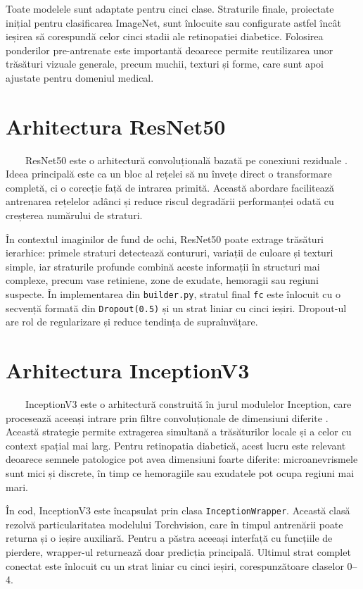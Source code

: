 \documentclass[12pt, a4paper, oneside, romanian]{teza-upb}
\begin{document}
Toate modelele sunt adaptate pentru cinci clase. Straturile finale, proiectate inițial pentru clasificarea ImageNet, sunt înlocuite sau configurate astfel încât ieșirea să corespundă celor cinci stadii ale retinopatiei diabetice. Folosirea ponderilor pre-antrenate este importantă deoarece permite reutilizarea unor trăsături vizuale generale, precum muchii, texturi și forme, care sunt apoi ajustate pentru domeniul medical.

\section{Arhitectura ResNet50}

\ \ \ \ ResNet50 este o arhitectură convoluțională bazată pe conexiuni reziduale \cite{21_he2016deep}. Ideea principală este ca un bloc al rețelei să nu învețe direct o transformare completă, ci o corecție față de intrarea primită. Această abordare facilitează antrenarea rețelelor adânci și reduce riscul degradării performanței odată cu creșterea numărului de straturi.
\bigskip

În contextul imaginilor de fund de ochi, ResNet50 poate extrage trăsături ierarhice: primele straturi detectează contururi, variații de culoare și texturi simple, iar straturile profunde combină aceste informații în structuri mai complexe, precum vase retiniene, zone de exudate, hemoragii sau regiuni suspecte. În implementarea din \texttt{builder.py}, stratul final \texttt{fc} este înlocuit cu o secvență formată din \texttt{Dropout(0.5)} și un strat liniar cu cinci ieșiri. Dropout-ul are rol de regularizare și reduce tendința de supraînvățare.

\section{Arhitectura InceptionV3}

\ \ \ \ InceptionV3 este o arhitectură construită în jurul modulelor Inception, care procesează aceeași intrare prin filtre convoluționale de dimensiuni diferite \cite{22_szegedy2016rethinking}. Această strategie permite extragerea simultană a trăsăturilor locale și a celor cu context spațial mai larg. Pentru retinopatia diabetică, acest lucru este relevant deoarece semnele patologice pot avea dimensiuni foarte diferite: microanevrismele sunt mici și discrete, în timp ce hemoragiile sau exudatele pot ocupa regiuni mai mari.
\bigskip

În cod, InceptionV3 este încapsulat prin clasa \texttt{InceptionWrapper}. Această clasă rezolvă particularitatea modelului Torchvision, care în timpul antrenării poate returna și o ieșire auxiliară. Pentru a păstra aceeași interfață cu funcțiile de pierdere, wrapper-ul returnează doar predicția principală. Ultimul strat complet conectat este înlocuit cu un strat liniar cu cinci ieșiri, corespunzătoare claselor 0--4.
\end{document}
